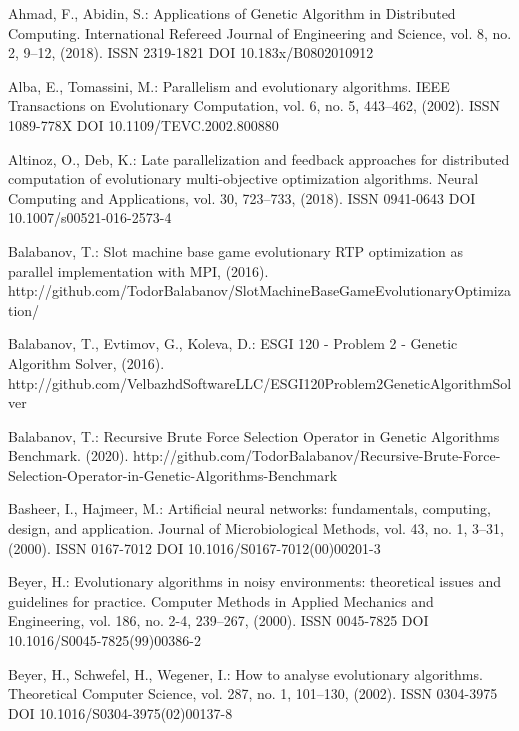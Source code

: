 
\begin{thebibliography}{99.}

 Ahmad, F., Abidin, S.: Applications of Genetic Algorithm in Distributed Computing. International Refereed Journal of Engineering and Science, vol. 8, no. 2, 9--12, (2018). ISSN 2319-1821 DOI 10.183x/B0802010912

 Alba, E., Tomassini, M.: Parallelism and evolutionary algorithms. IEEE Transactions on Evolutionary Computation, vol. 6, no. 5, 443--462, (2002). ISSN 1089-778X DOI 10.1109/TEVC.2002.800880

 Altinoz, O., Deb, K.: Late parallelization and feedback approaches for distributed computation of evolutionary multi-objective optimization algorithms. Neural Computing and Applications, vol. 30, 723--733, (2018). ISSN 0941-0643 DOI 10.1007/s00521-016-2573-4

 Balabanov, T.: Slot machine base game evolutionary RTP optimization as parallel implementation with MPI, (2016). http://github.com/TodorBalabanov/SlotMachineBaseGameEvolutionaryOptimization/

 Balabanov, T., Evtimov, G., Koleva, D.: ESGI 120 - Problem 2 - Genetic Algorithm Solver, (2016). http://github.com/VelbazhdSoftwareLLC/ESGI120Problem2GeneticAlgorithmSolver

 Balabanov, T.: Recursive Brute Force Selection Operator in Genetic Algorithms Benchmark. (2020). http://github.com/TodorBalabanov/Recursive-Brute-Force-Selection-Operator-in-Genetic-Algorithms-Benchmark

 Basheer, I., Hajmeer, M.: Artificial neural networks: fundamentals, computing, design, and application. Journal of Microbiological Methods, vol. 43, no. 1, 3--31, (2000). ISSN 0167-7012 DOI 10.1016/S0167-7012(00)00201-3

 Beyer, H.: Evolutionary algorithms in noisy environments: theoretical issues and guidelines for practice. Computer Methods in Applied Mechanics and Engineering, vol. 186, no. 2-4, 239--267, (2000). ISSN 0045-7825 DOI 10.1016/S0045-7825(99)00386-2

 Beyer, H., Schwefel, H., Wegener, I.: How to analyse evolutionary algorithms. Theoretical Computer Science, vol. 287, no. 1, 101--130, (2002). ISSN 0304-3975 DOI 10.1016/S0304-3975(02)00137-8


\end{thebibliography}
